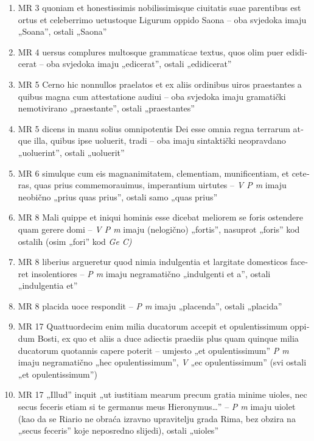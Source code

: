 \documentclass[a5paper,twoside]{article}
\begin{document}
\begin{enumerate}[label=\alph*)]
\item MR 3 \textlatin{quoniam et honestissimis nobilissimisque ciuitatis suae parentibus est ortus et celeberrimo uetustoque Ligurum oppido Saona} – oba svjedoka imaju „Soana”, ostali „Saona”
\item MR 4 \textlatin{uersus complures multosque grammaticae textus, quos olim puer edidicerat} – oba svjedoka imaju „edicerat”, ostali „edidicerat”
\item MR 5 \textlatin{Cerno hic nonnullos praelatos et ex aliis ordinibus uiros praestantes a quibus magna cum attestatione audiui} – oba svjedoka imaju gramatički nemotivirano „praestante”, ostali „praestantes”
\item MR 5 \textlatin{dicens in manu solius omnipotentis Dei esse omnia regna terrarum atque illa, quibus ipse uoluerit, tradi} – oba imaju sintaktički neopravdano „uoluerint”, ostali „uoluerit”
\item MR 6 \textlatin{simulque cum eis magnanimitatem, clementiam, munificentiam, et ceteras, quas prius commemorauimus, imperantium uirtutes} – \textit{V P m} imaju neobično „prius quas prius”, ostali samo „quas prius”
\item MR 8 \textlatin{Mali quippe et iniqui hominis esse dicebat meliorem se foris ostendere quam gerere domi} – \textit{V P m} imaju (nelogično) „fortis”, nasuprot „foris” kod ostalih (osim „fori” kod \textit{Ge C)}
\item MR 8 \textlatin{liberius argueretur quod nimia indulgentia et largitate domesticos faceret insolentiores} – \textit{P m} imaju negramatično „indulgenti et a”, ostali „indulgentia et”
\item MR 8 \textlatin{placida uoce respondit} – \textit{P m} imaju „placenda”, ostali „placida”
\item MR 17 \textlatin{Quattuordecim enim milia ducatorum accepit et opulentissimum oppidum Bosti, ex quo et aliis a duce adiectis praediis plus quam quinque milia ducatorum quotannis capere poterit} – umjesto „et opulentissimum” \textit{P m} imaju negramatično „hec opulentissimum”, \textit{V} „ec opulentissimum” (svi ostali „et opulentissimum”)
\item MR 17 \textlatin{„Illud” inquit „ut iustitiam mearum precum gratia minime uioles, nec secus feceris etiam si te germanus meus Hieronymus\dots”} – \textit{P m} imaju uiolet (kao da se Riario ne obraća izravno upravitelju grada Rima, bez obzira na „secus feceris” koje neposredno slijedi), ostali „uioles”

\end{enumerate}
\end{document}
